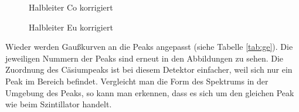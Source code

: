 \newpage

\begin{figure}[h]
\centering
{}
\caption{Halbleiter Co korrigiert}
\label{fig:ge_co}
\end{figure}

\begin{figure}[!h]
\centering
{}
\caption{Halbleiter Eu korrigiert}
\label{fig:ge_eu}
\end{figure}

Wieder werden Gaußkurven an die Peaks angepasst (siehe Tabelle \ref{tab:ge}). Die jeweiligen Nummern der Peaks sind erneut in den Abbildungen zu sehen. Die Zuordnung des Cäsiumpeaks ist bei diesem Detektor einfacher, weil sich nur ein Peak im Bereich befindet. Vergleicht man die Form des Spektrums in der Umgebung des Peaks, so kann man erkennen, dass es sich um den gleichen Peak wie beim Szintillator handelt.\\

